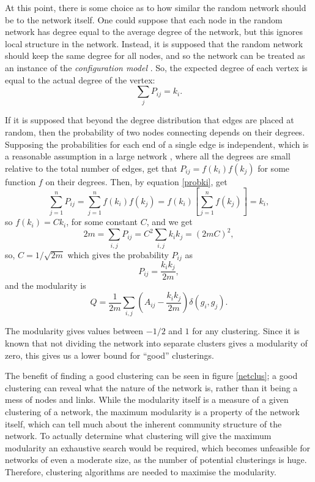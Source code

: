 At this point, there is some choice as to how similar the random network should be to the network itself.  One could suppose that each node 
in the random network has degree equal to the average degree of the 
network, but this ignores local structure in the network.  Instead, it is supposed that 
the random network should keep the same degree for all nodes, and so the network can be treated as an instance of the \emph{configuration model} \citep{BenderCanfield1978a, Bollobas1980a}.  So, the expected 
degree of each vertex is equal to the actual degree of the vertex:
\begin{equation}
\sum_j P_{ij} = k_i.
\label{probki}
\end{equation}

If it is supposed that beyond the degree distribution that edges are placed at random, 
then the probability of two nodes connecting depends on their 
degrees. Supposing the probabilities for each end of a single edge is independent, which is a reasonable assumption in a large network \citep{Newman2010a}, where all the degrees are small 
relative to the total number of edges, get that $P_{ij} = f(k_i)f(k_j)$ for 
some function $f$ on their degrees.  Then, by equation \ref{probki}, get
\begin{equation}
\sum_{j=1}^{n}P_{ij} = \sum_{j=1}^n f(k_i)f(k_j) = f(k_i)\left[\sum_{j=1}^n f(k_j)\right]=k_i,
\end{equation}
so $f(k_i) = Ck_i$, for some constant $C$, and we get
\begin{equation}
2m = \sum_{i,j}P_{ij} = C^2\sum_{i,j}k_ik_j = (2mC)^2,
\end{equation}
so, $C = 1/\sqrt{2m}$ which gives the probability $P_{ij}$ as
\begin{equation}
P_{ij} = \frac{k_i k_j}{2m},
\end{equation}
and the modularity is
\begin{equation}\label{NewMod}
Q= \frac{1}{2m}\sum_{i,j} \left(A_{ij} -
\frac{k_ik_j}{2m}\right)\delta(g_i,g_j).
\end{equation}

The modularity gives values between $-1/2$ and $1$ for any clustering.  Since it is known that not 
dividing the network into separate clusters gives a modularity of zero, this 
gives us a lower bound for ``good'' clusterings.

The benefit of finding a good clustering can be seen in figure \ref{netclus}; 
a good clustering can reveal what the nature of the network is, rather than it 
being a mess of nodes and links.  While the modularity itself is a measure of a 
given clustering of a network, the maximum modularity is a property of the 
network itself, which can tell much about the inherent community structure of the 
network. To actually determine what clustering will give the maximum modularity an exhaustive search would be required, which becomes unfeasible for networks of even  a moderate size, as the number of potential clusterings is huge. Therefore, clustering algorithms are needed to 
maximise the modularity.



